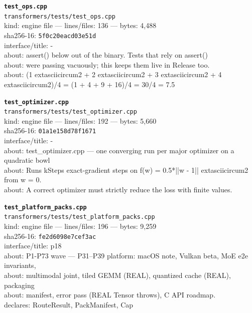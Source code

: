 \noindent\textbf{\texttt{test\_ops.cpp}}\\
\texttt{transformers/tests/test\_ops.cpp}\\
kind: engine file --- lines/files: 136 --- bytes: 4,488\\
sha256-16: \texttt{5f0c20eacd03e51d}\\
interface/title: -\\
about: assert() below out of the binary. Tests that rely on assert()\\
about: were passing vacuously; this keeps them live in Release too.\\
about: (1	extasciicircum{}2 + 2	extasciicircum{}2 + 3	extasciicircum{}2 + 4	extasciicircum{}2)/4 = (1 + 4 + 9 + 16)/4 = 30/4 = 7.5\\
\vspace*{6.0pt}

\noindent\textbf{\texttt{test\_optimizer.cpp}}\\
\texttt{transformers/tests/test\_optimizer.cpp}\\
kind: engine file --- lines/files: 192 --- bytes: 5,660\\
sha256-16: \texttt{01a1e158d78f1671}\\
interface/title: -\\
about: test\_optimizer.cpp — one converging run per major optimizer on a quadratic bowl\\
about: Runs kSteps exact-gradient steps on f(w) = 0.5*||w - 1||	extasciicircum{}2 from w = 0.\\
about: A correct optimizer must strictly reduce the loss with finite values.\\
\vspace*{6.0pt}
\newpage

\noindent\textbf{\texttt{test\_platform\_packs.cpp}}\\
\texttt{transformers/tests/test\_platform\_packs.cpp}\\
kind: engine file --- lines/files: 196 --- bytes: 9,259\\
sha256-16: \texttt{fe2d6098e7cef3ac}\\
interface/title: p18\\
about: P1-P73 wave — P31–P39 platform: macOS note, Vulkan beta, MoE e2e invariants,\\
about: multimodal joint, tiled GEMM (REAL), quantized cache (REAL), packaging\\
about: manifest, error pass (REAL Tensor throws), C API roadmap.\\
declares: RouteResult, PackManifest, Cap\\
\vspace*{6.0pt}

